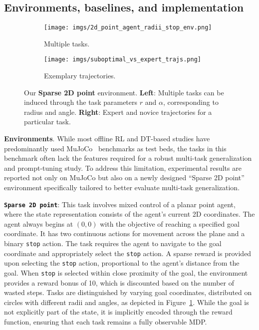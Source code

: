 \documentclass{article} %
\begin{document}
\subsection{Environments, baselines, and implementation}
%
\begin{figure}
    \centering
    \begin{subfigure}{0.215\textwidth}
        \texttt{[image: imgs/2d\_point\_agent\_radii\_stop\_env.png]}
        \caption{Multiple tasks.}
        \label{subfig:2d_env_tasks}
    \end{subfigure}
    \begin{subfigure}{0.22\textwidth}\texttt{[image: imgs/suboptimal\_vs\_expert\_trajs.png]}
        \caption{Exemplary trajectories.}
        \label{subfig:expert_vs_novice}
    \end{subfigure}
    \caption{Our \textbf{Sparse 2D point} environment. \textbf{Left}: Multiple tasks can be induced through the task parameters $r$ and $\alpha$, corresponding to radius and angle. \textbf{Right}: Expert and novice trajectories for a particular task.}
    \label{fig:2d_env_overview}
\end{figure}

\textbf{Environments}. While most offline RL and DT-based studies have predominantly used MuJoCo~\citep{todorov2012mujoco} benchmarks as test beds, the tasks in this benchmark often lack the features required for a robust multi-task generalization and prompt-tuning study. To address this limitation, experimental results are reported not only on MuJoCo but also on a newly designed ``Sparse 2D point'' environment specifically tailored to better evaluate multi-task generalization.

\quad\textbf{\texttt{Sparse 2D point}}: This task involves mixed control of a planar point agent, where the state representation consists of the agent's current 2D coordinates. The agent always begins at $(0,0)$ with the objective of reaching a specified goal coordinate. It has two continuous actions for movement across the plane and a binary \texttt{stop} action. The task requires the agent to navigate to the goal coordinate and appropriately select the \texttt{stop} action. A sparse reward is provided upon selecting the \texttt{stop} action, proportional to the agent's distance from the goal. When \texttt{stop} is selected within close proximity of the goal, the environment provides a reward bonus of 10, which is discounted based on the number of wasted steps. Tasks are distinguished by varying goal coordinates, distributed on circles with different radii and angles, as depicted in Figure~\ref{subfig:2d_env_tasks}. 
While the goal is not explicitly part of the state, it is implicitly encoded through the reward function, ensuring that each task remains a fully observable MDP.
    
\end{document}

